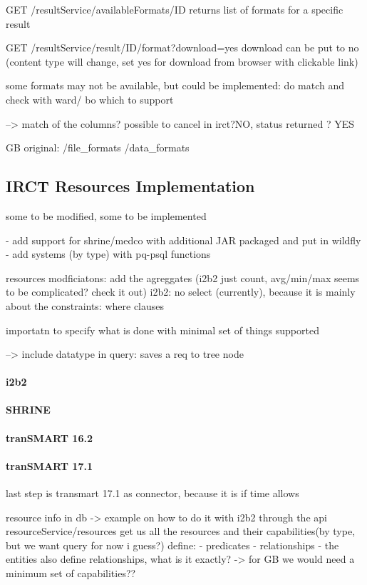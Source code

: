 GET /resultService/availableFormats/ID
returns list of formats for a specific result

GET /resultService/result/ID/format?download=yes
download can be put to no (content type will change, set yes for download from browser with clickable link)


some formats may not be available, but could be implemented: do match and check with ward/ bo which to support

--> match of the columns? possible to cancel in irct?NO, status returned ? YES

GB original: 
/file\_formats
/data\_formats


\subsection{IRCT Resources Implementation}
some to be modified, some to be implemented

- add support for shrine/medco with additional JAR packaged and put in wildfly
- add systems (by type) with pq-psql functions

resources modficiatons: add the agreggates (i2b2 just count, avg/min/max seems to be complicated? check it out)
i2b2: no select (currently), because it is mainly about the constraints: where clauses

importatn to specify what is done with minimal set of things supported

--> include datatype in query: saves a req to tree node
\paragraph{i2b2}

\paragraph{SHRINE}

\paragraph{tranSMART 16.2}

\paragraph{tranSMART 17.1}
last step is transmart 17.1 as connector, because it is if time allows


resource info in db -> example on how to do it with i2b2
through the api resourceService/resources get us all the resources and their capabilities(by type, but we want query for now i guess?)
define:
- predicates
- relationships
- the entities also define relationships, what is it exactly?
-> for GB we would need a minimum set of capabilities??

